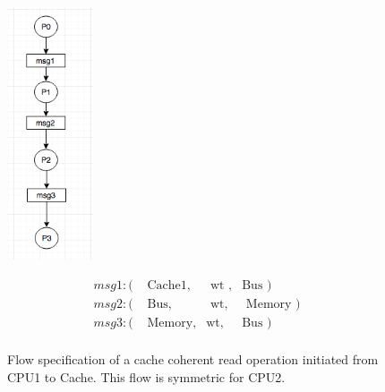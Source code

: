 \documentclass[12pt,frontmatter,copyright,thesis]{usfmanus}
\begin{document}
\begin{appendix}
 \begin{figure}[h]
 \centerline{
 \includegraphics[width=1in]{wbprotocol}}
 {\footnotesize
 \[
 \begin{array}{llll}
 msg1: (&\mbox{ Cache1},&\mbox{ wt },&\mbox{Bus })\\     
 msg2: (&\mbox{ Bus},&\mbox{ wt},&\mbox{ Memory     })\\ 
 msg3: (&\mbox{ Memory},&\mbox{wt},&\mbox{Bus     })\\
 \end{array}
 \]}

  \caption{\footnotesize Flow specification of a cache coherent read operation initiated from CPU1 to Cache. \footnotesize This flow is symmetric for CPU2. }
 \label{wbprotocol}
 \end{figure}


\end{appendix}
\end{document}
